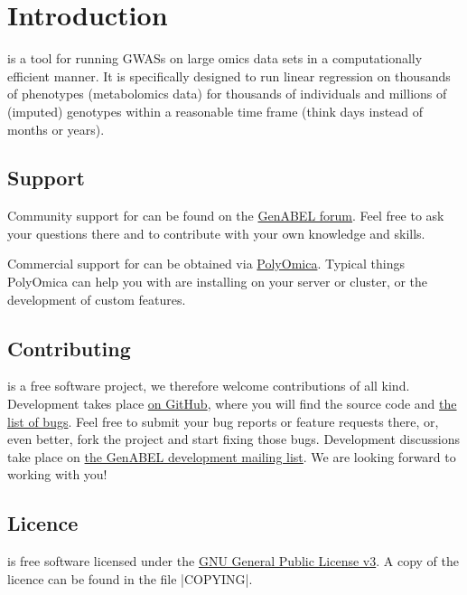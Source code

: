 \chapter{Introduction}
\oanomm is a tool for running \acp{GWAS} on large omics data sets in a
computationally efficient manner. It is specifically designed to run
linear regression on thousands of phenotypes (\eg metabolomics data)
for thousands of individuals and millions of (imputed) genotypes
within a reasonable time frame (think days instead of months or
years).

\section{Support}
Community support for \oanomm can be found on the
\href{http://forum.genabel.org}{GenABEL forum}. Feel free to ask your
questions there and to contribute with your own knowledge and skills.

Commercial support for \oanomm can be obtained via
\href{http://www.polyomica.com}{PolyOmica}. Typical things PolyOmica
can help you with are installing \oanomm on your server or
cluster, or the development of custom features.

\section{Contributing}
\oanomm is a free software project, we therefore welcome contributions
of all kind. Development takes place
\href{https://github.com/GenABEL-Project/OmicABELnoMM}{on GitHub},
where you will find the source code and
\href{https://github.com/GenABEL-Project/OmicABELnoMM/issues}{the list
  of bugs}. Feel free to submit your bug reports or feature requests
there, or, even better, fork the project and start fixing those bugs.
Development discussions take place on
\href{https://lists.r-forge.r-project.org/mailman/listinfo/genabel-devel}{the
  GenABEL development mailing list}. We are looking forward to working
with you!

\section{Licence}
\oanomm is free software licensed under the
\href{https://www.gnu.org/licenses/gpl.html}{GNU General Public
  License v3}. A copy of the licence can be found in the file
|COPYING|.



